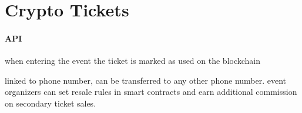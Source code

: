 
\section{Crypto Tickets}

\paragraph{API}
when entering the event the ticket is marked as used on the blockchain

linked to phone number, can be transferred to any other phone number.
event organizers can set resale rules in smart contracts and earn additional commission on secondary ticket sales.
